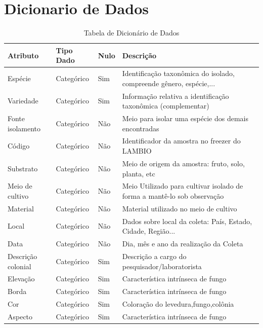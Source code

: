 \documentclass[tcc2]{classe_uftex/uftex}
\begin{document}
\chapter{Dicionario de Dados}
\label{ape:dicionario}

\begin{table}[hbt]
\caption{Tabela de Dicionário de Dados}
  \label{tab:tabelaD}
\begin{tabularx}{\textwidth}{l|l|l|X}
  \toprule
  \textbf{Atributo} & \textbf{Tipo Dado} & \textbf{Nulo} & \textbf{Descrição} \\
   \midrule
    Espécie & Categórico & Sim & Identificação taxonômica do isolado, compreende gênero, espécie,... \\
    \hline
    Variedade & Categórico & Sim & Informação relativa a identificação taxonômica (complementar) \\
    \hline
    Fonte isolamento & Categórico & Não & Meio para isolar uma espécie dos demais encontradas \\%
    \hline
    Código & Categórico & Não & Identificador da amostra no freezer do LAMBIO \\
    \hline
    Substrato &  Categórico & Não & Meio de origem da amostra: fruto, solo, planta, etc \\
    \hline
    Meio de cultivo &  Categórico & Não & Meio Utilizado para cultivar isolado de forma a mantê-lo sob observação \\%
    \hline
    Material &  Categórico & Não & Material utilizado no meio de cultivo \\%
    \hline
    Local &  Categórico & Não & Dados sobre local da coleta: País, Estado, Cidade, Região... \\
    \hline
    Data &  Categórico & Não & Dia, mês e ano da realização da Coleta \\
    \hline
    Descrição colonial & Categórico & Sim & Descrição a cargo do pesquisador/laboratorista \\
    \hline
    Elevação & Categórico & Sim & Característica intrínseca de fungo \\
    \hline
    Borda & Categórico & Sim & Característica intrínseca de fungo \\
    \hline
    Cor & Categórico & Sim & Coloração do levedura,fungo,colônia \\
    \hline
    Aspecto & Categórico & Sim & Característica intrínseca de fungo \\

\end{tabularx}
\end{table}
\end{document}
